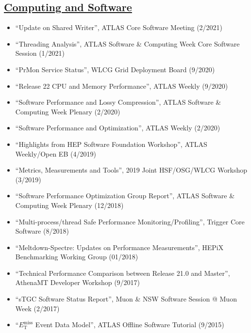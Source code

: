 \documentclass[a4paper,10pt]{article}
\begin{document}
\subsection{\underline{Computing and Software}}
\vspace{1mm}
\begin{itemize}
	\item ``Update on Shared Writer'', ATLAS Core Software Meeting (2/2021)
	\item ``Threading Analysis'', ATLAS Software \& Computing Week Core Software Session (1/2021)
	\item ``PrMon Service Status'', WLCG Grid Deployment Board (9/2020)
	\item ``Release 22 CPU and Memory Performance'', ATLAS Weekly (9/2020)
	\item ``Software Performance and Lossy Compression'', ATLAS Software \& Computing Week Plenary (2/2020)
	\item ``Software Performance and Optimization'', ATLAS Weekly (2/2020)
	\item ``Highlights from HEP Software Foundation Workshop'', ATLAS Weekly/Open EB (4/2019)
	\item ``Metrics, Measurements and Tools'', 2019 Joint HSF/OSG/WLCG Workshop (3/2019)
	\item ``Software Performance Optimization Group Report'', ATLAS Software \& Computing Week Plenary (12/2018) 
	\item ``Multi-process/thread Safe Performance Monitoring/Profiling'', Trigger Core Software (8/2018)
	\item ``Meltdown-Spectre: Updates on Performance Measurements'', HEPiX Benchmarking Working Group (01/2018)
	\item ``Technical Performance Comparison between Release 21.0 and Master'', AthenaMT Developer Workshop (9/2017)
	\item ``sTGC Software Status Report'', Muon \& NSW Software Session @ Muon Week (2/2017)
	\item ``$E_{\mathrm{T}}^{\mathrm{miss}}$ Event Data Model'', ATLAS Offline Software Tutorial (9/2015)
\end{itemize}
\vspace{1mm}
\end{document}

